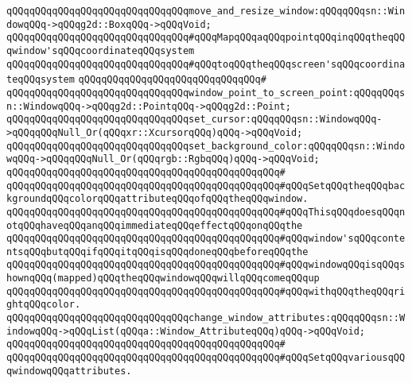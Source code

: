 \verb|qQQqqQQqqQQqqQQqqQQqqQQqqQQqqQQqmove_and_resize_window:qQQqqQQqsn::WindowqQQq->qQQqg2d::BoxqQQq->qQQqVoid;|\newline
\newline
\verb|qQQqqQQqqQQqqQQqqQQqqQQqqQQqqQQq#qQQqMapqQQqaqQQqpointqQQqinqQQqtheqQQqwindow'sqQQqcoordinateqQQqsystem|\newline
\verb|qQQqqQQqqQQqqQQqqQQqqQQqqQQqqQQq#qQQqtoqQQqtheqQQqscreen'sqQQqcoordinateqQQqsystem|\newline
\verb|qQQqqQQqqQQqqQQqqQQqqQQqqQQqqQQq#|\newline
\verb|qQQqqQQqqQQqqQQqqQQqqQQqqQQqqQQqwindow_point_to_screen_point:qQQqqQQqsn::WindowqQQq->qQQqg2d::PointqQQq->qQQqg2d::Point;|\newline
\newline
\verb|qQQqqQQqqQQqqQQqqQQqqQQqqQQqqQQqset_cursor:qQQqqQQqsn::WindowqQQq->qQQqqQQqNull_Or(qQQqxr::XcursorqQQq)qQQq->qQQqVoid;|\newline
\newline
\verb|qQQqqQQqqQQqqQQqqQQqqQQqqQQqqQQqset_background_color:qQQqqQQqsn::WindowqQQq->qQQqqQQqNull_Or(qQQqrgb::RgbqQQq)qQQq->qQQqVoid;|\newline
\verb|qQQqqQQqqQQqqQQqqQQqqQQqqQQqqQQqqQQqqQQqqQQqqQQq#|\newline
\verb|qQQqqQQqqQQqqQQqqQQqqQQqqQQqqQQqqQQqqQQqqQQqqQQq#qQQqSetqQQqtheqQQqbackgroundqQQqcolorqQQqattributeqQQqofqQQqtheqQQqwindow.|\newline
\verb|qQQqqQQqqQQqqQQqqQQqqQQqqQQqqQQqqQQqqQQqqQQqqQQq#qQQqThisqQQqdoesqQQqnotqQQqhaveqQQqanqQQqimmediateqQQqeffectqQQqonqQQqthe|\newline
\verb|qQQqqQQqqQQqqQQqqQQqqQQqqQQqqQQqqQQqqQQqqQQqqQQq#qQQqwindow'sqQQqcontentsqQQqbutqQQqifqQQqitqQQqisqQQqdoneqQQqbeforeqQQqthe|\newline
\verb|qQQqqQQqqQQqqQQqqQQqqQQqqQQqqQQqqQQqqQQqqQQqqQQq#qQQqwindowqQQqisqQQqshownqQQq(mapped)qQQqtheqQQqwindowqQQqwillqQQqcomeqQQqup|\newline
\verb|qQQqqQQqqQQqqQQqqQQqqQQqqQQqqQQqqQQqqQQqqQQqqQQq#qQQqwithqQQqtheqQQqrightqQQqcolor.|\newline
\newline
\newline
\verb|qQQqqQQqqQQqqQQqqQQqqQQqqQQqqQQqchange_window_attributes:qQQqqQQqsn::WindowqQQq->qQQqList(qQQqa::Window_AttributeqQQq)qQQq->qQQqVoid;|\newline
\verb|qQQqqQQqqQQqqQQqqQQqqQQqqQQqqQQqqQQqqQQqqQQqqQQq#|\newline
\verb|qQQqqQQqqQQqqQQqqQQqqQQqqQQqqQQqqQQqqQQqqQQqqQQq#qQQqSetqQQqvariousqQQqwindowqQQqattributes.|\newline

